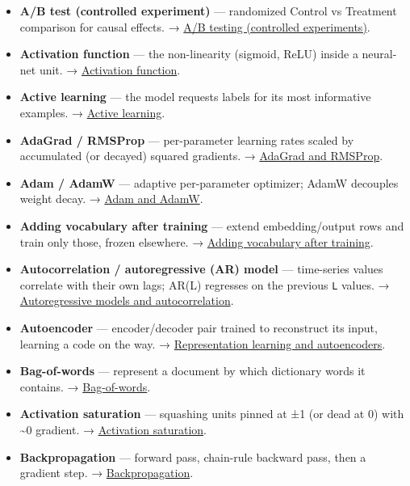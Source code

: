 \documentclass[
  10pt,
  letterpaper,
  onecolumn]{article}
\providecommand{\tightlist}{%
  \setlength{\itemsep}{0pt}\setlength{\parskip}{0pt}}
\begin{document}
\begin{itemize}
\tightlist
\item
  \textbf{A/B test (controlled experiment)} --- randomized Control vs
  Treatment comparison for causal effects. →
  \protect\hyperlink{ab-testing-controlled-experiments}{A/B testing
  (controlled experiments)}.
\item
  \textbf{Activation function} --- the non-linearity (sigmoid, ReLU)
  inside a neural-net unit. →
  \protect\hyperlink{activation-function}{Activation function}.
\item
  \textbf{Active learning} --- the model requests labels for its most
  informative examples. → \protect\hyperlink{active-learning}{Active
  learning}.
\item
  \textbf{AdaGrad / RMSProp} --- per-parameter learning rates scaled by
  accumulated (or decayed) squared gradients. →
  \protect\hyperlink{adagrad-and-rmsprop}{AdaGrad and RMSProp}.
\item
  \textbf{Adam / AdamW} --- adaptive per-parameter optimizer; AdamW
  decouples weight decay. → \protect\hyperlink{adam-and-adamw}{Adam and
  AdamW}.
\item
  \textbf{Adding vocabulary after training} --- extend embedding/output
  rows and train only those, frozen elsewhere. →
  \protect\hyperlink{adding-vocabulary-after-training}{Adding vocabulary
  after training}.
\item
  \textbf{Autocorrelation / autoregressive (AR) model} --- time-series
  values correlate with their own lags; AR(L) regresses on the previous
  \texttt{L} values. →
  \protect\hyperlink{autoregressive-models-and-autocorrelation}{Autoregressive
  models and autocorrelation}.
\item
  \textbf{Autoencoder} --- encoder/decoder pair trained to reconstruct
  its input, learning a code on the way. →
  \protect\hyperlink{representation-learning-and-autoencoders}{Representation
  learning and autoencoders}.
\item
  \textbf{Bag-of-words} --- represent a document by which dictionary
  words it contains. → \protect\hyperlink{bag-of-words}{Bag-of-words}.
\item
  \textbf{Activation saturation} --- squashing units pinned at ±1 (or
  dead at 0) with \textasciitilde0 gradient. →
  \protect\hyperlink{activation-saturation}{Activation saturation}.
\item
  \textbf{Backpropagation} --- forward pass, chain-rule backward pass,
  then a gradient step. →
  \protect\hyperlink{backpropagation}{Backpropagation}.

\end{itemize}
\end{document}
